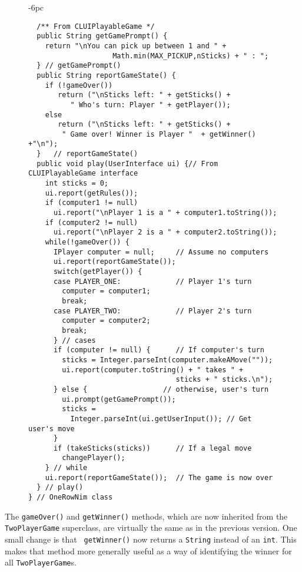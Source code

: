 \begin{figure}[h!]
\jjjprogstart
\begin{jjjlistingleft}[32pc]{-6pc}
\begin{lstlisting}
  /** From CLUIPlayableGame */
  public String getGamePrompt() {
    return "\nYou can pick up between 1 and " + 
                    Math.min(MAX_PICKUP,nSticks) + " : ";
  } // getGamePrompt()
  public String reportGameState() {   
    if (!gameOver())
       return ("\nSticks left: " + getSticks() + 
          " Who's turn: Player " + getPlayer());
    else
       return ("\nSticks left: " + getSticks() + 
        " Game over! Winner is Player "  + getWinner() +"\n");
  }   // reportGameState()
  public void play(UserInterface ui) {// From CLUIPlayableGame interface
    int sticks = 0;
    ui.report(getRules());
    if (computer1 != null) 
      ui.report("\nPlayer 1 is a " + computer1.toString());
    if (computer2 != null)
      ui.report("\nPlayer 2 is a " + computer2.toString());
    while(!gameOver()) {  
      IPlayer computer = null;     // Assume no computers
      ui.report(reportGameState());
      switch(getPlayer()) {
      case PLAYER_ONE:             // Player 1's turn
        computer = computer1;
        break;
      case PLAYER_TWO:             // Player 2's turn
        computer = computer2;
        break;
      } // cases
      if (computer != null) {      // If computer's turn
        sticks = Integer.parseInt(computer.makeAMove(""));
        ui.report(computer.toString() + " takes " + 
                                   sticks + " sticks.\n");
      } else {                  // otherwise, user's turn
        ui.prompt(getGamePrompt());
        sticks = 
          Integer.parseInt(ui.getUserInput()); // Get user's move 
      }
      if (takeSticks(sticks))      // If a legal move
        changePlayer();
    } // while
    ui.report(reportGameState());  // The game is now over
  } // play()
} // OneRowNim class
\end{lstlisting}
\end{jjjlistingleft}
\end{figure}

The {\tt gameOver()} and {\tt getWinner()} methods, which are now
inherited from the {\tt TwoPlayerGame} superclass, are virtually the
same as in the previous version. One small change is that {\tt
getWinner()} now returns a {\tt String} instead of an {\tt int}.  This
makes that method more generally useful as a way of identifying the
winner for all {\tt TwoPlayerGame}s.  

